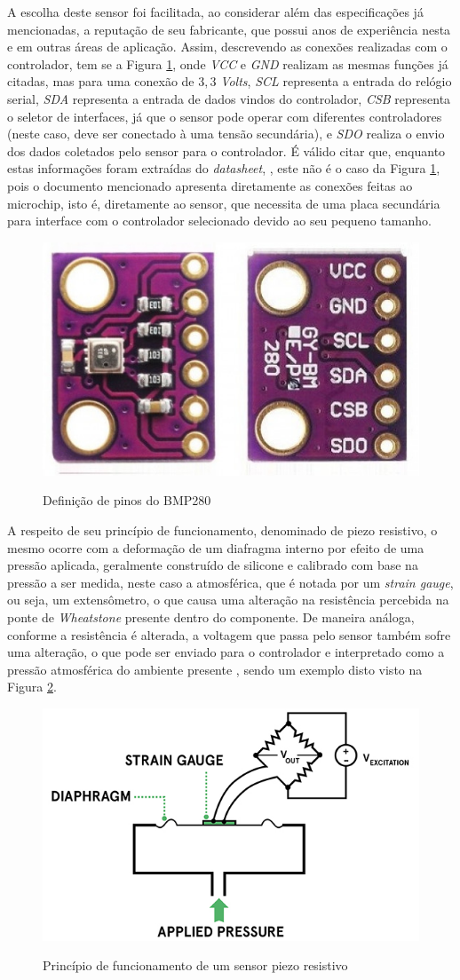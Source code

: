 \documentclass[acronym,symbols,table]{fei}
\begin{document}
A escolha deste sensor foi facilitada, ao considerar além das especificações já mencionadas, a reputação de seu fabricante, que possui anos de experiência nesta e em outras áreas de aplicação. Assim, descrevendo as conexões realizadas com o controlador, tem se a Figura \ref{fig:PinPress}, onde \textit{VCC} e \textit{GND} realizam as mesmas funções já citadas, mas para uma conexão de $3,3$ \textit{Volts}, \textit{SCL} representa a entrada do relógio serial, \textit{SDA} representa a entrada de dados vindos do controlador, \textit{CSB} representa o seletor de interfaces, já que o sensor pode operar com diferentes controladores (neste caso, deve ser conectado à uma tensão secundária), e \textit{SDO} realiza o envio dos dados coletados pelo sensor para o controlador. É válido citar que, enquanto estas informações foram extraídas do \textit{datasheet}, \textcite{BMP280}, este não é o caso da Figura \ref{fig:PinPress}, pois o documento mencionado apresenta diretamente as conexões feitas ao microchip, isto é, diretamente ao sensor, que necessita de uma placa secundária para interface com o controlador selecionado devido ao seu pequeno tamanho.

\begin{figure}[!htb]
\centering
    \caption{Definição de pinos do BMP280}
    \includegraphics[width=0.25\linewidth]{Imagens/PinPress.png}
    \label{fig:PinPress}
\end{figure}

A respeito de seu princípio de funcionamento, denominado de piezo resistivo, o mesmo ocorre com a deformação de um diafragma interno por efeito de uma pressão aplicada, geralmente construído de silicone e calibrado com base na pressão a ser medida, neste caso a atmosférica, que é notada por um \textit{strain gauge}, ou seja, um extensômetro, o que causa uma alteração na resistência percebida na ponte de \textit{Wheatstone} presente dentro do componente. De maneira análoga, conforme a resistência é alterada, a voltagem que passa pelo sensor também sofre uma alteração, o que pode ser enviado para o controlador e interpretado como a pressão atmosférica do ambiente presente \cite{piezo}, sendo um exemplo disto visto na Figura \ref{fig:piezoresist}.

\begin{figure}[!htb]
\centering
    \caption{Princípio de funcionamento de um sensor piezo resistivo}
    \includegraphics[width=0.4\linewidth]{Imagens/piezoresist.jpg}
    \label{fig:piezoresist}
\end{figure}
\end{document}
